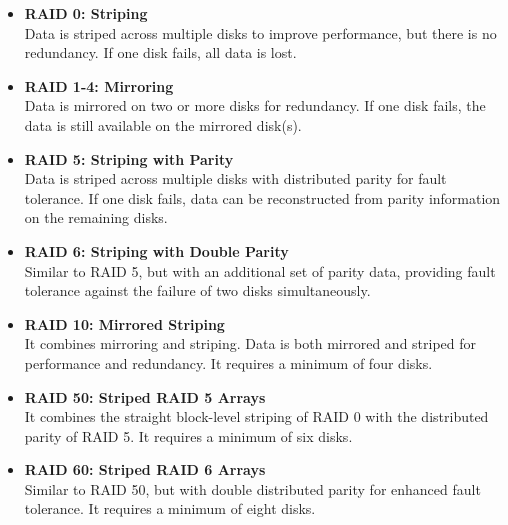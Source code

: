 \begin{itemize}[left=0pt, align=left]

   \item \textbf{RAID 0: Striping}\\
      Data is striped across multiple disks to improve performance, but there is no redundancy. If one disk fails, all data is lost.

   \item \textbf{RAID 1-4: Mirroring}\\
      Data is mirrored on two or more disks for redundancy. If one disk fails, the data is still available on the mirrored disk(s).

   \item \textbf{RAID 5: Striping with Parity}\\
      Data is striped across multiple disks with distributed parity for fault tolerance. If one disk fails, data can be reconstructed from parity information on the remaining disks.

   \item \textbf{RAID 6: Striping with Double Parity}\\
      Similar to RAID 5, but with an additional set of parity data, providing fault tolerance against the failure of two disks simultaneously.

   \item \textbf{RAID 10: Mirrored Striping}\\
      It combines mirroring and striping. Data is both mirrored and striped for performance and redundancy. It requires a minimum of four disks.

   \item \textbf{RAID 50: Striped RAID 5 Arrays}\\
      It combines the straight block-level striping of RAID 0 with the distributed parity of RAID 5. It requires a minimum of six disks.

   \item \textbf{RAID 60: Striped RAID 6 Arrays}\\
      Similar to RAID 50, but with double distributed parity for enhanced fault tolerance. It requires a minimum of eight disks.

\end{itemize}

